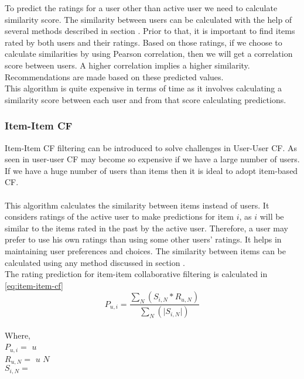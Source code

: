 \noindent To predict the ratings for a user other than active user we need to calculate similarity score. The similarity between users can be calculated with the help of several methods described in section . Prior to that, it is important to find items rated by both users and their ratings. Based on those ratings, if we choose to calculate similarities by using Pearson correlation, then we will get a correlation score between users. A higher correlation implies a higher similarity. Recommendations are made based on these predicted values.
\\
This algorithm is quite expensive in terms of time as it involves calculating a similarity score between each user and from that score calculating predictions.
\\

\subsubsection{Item-Item CF}

Item-Item CF filtering can be introduced to solve challenges in User-User CF. As seen in user-user CF may become so expensive if we have a large number of users. If we have a huge number of users than items then it is ideal to adopt item-based CF.
\\
\\
This algorithm calculates the similarity between items instead of users. It considers ratings of the active user to make predictions for item $i$, as $i$ will be similar to the items rated in the past by the active user. Therefore, a user may prefer to use his own ratings than using some other users' ratings. It helps in maintaining user preferences and choices. The similarity between items can be calculated using any method discussed in section .
\\
The rating prediction for item-item collaborative filtering is calculated in \autoref{eq:item-item-cf}
\begin{equation}
P_{u,i} = \frac { \sum_N(S_{i,N} * R_{u,N})}{\sum_N (\vert S_{i,N} \vert)}
\label{eq:item-item-cf}
\end{equation}
\\
Where,
\\
\noindent
$P_{u,i} = $  $u$
\\
$R_{u,N} = $  $u$  $N$
\\
$S_{i,N} = $
\\
\\

